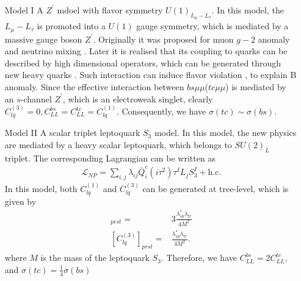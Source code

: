 \documentclass[a4paper,11pt]{article}
\begin{document}
\begin{enumerate}
    \item[Model I]   A $Z^{\prime}$ mdoel with flavor symmetry $U(1)_{L_{\mu}-L_{\tau}}$.
        In this model, the $L_{\mu}-L_{\tau}$ is promoted into a $U(1)$ gauge symmetry,
        which is mediated by a massive gauge boson $Z^{\prime}$.
    Originally it was proposed for muon $g-2$ anomaly \cite{Baek:2001kca} and neutrino mixing \cite{Ma:2001md}.
    Later it is realised that its coupling to quarks can be described by high dimensional operators, which can be generated through new heavy quarks \cite{Fox:2011qd}.
    Such interaction can induce flavor violation \cite{Altmannshofer:2014cfa}, to explain B anomaly.
    Since the effective interaction between $bs\mu\mu$($tc\mu\mu$) is mediated by an $s$-channel $Z^{\prime}$, which is an electroweak singlet,
    clearly $C_{lq}^{(3)}=0,C_{LL}^{bs}=C_{LL}^{tc}=C_{lq}^{(1)}$.
    Consequently, we have $\sigma(tc)\sim\sigma(bs)$.

    \item[Model II] A scalar triplet leptoquark $S_3$ model.
        In this model, the new physics are mediated by a heavy scalar leptoquark, which belongs to $SU(2)_L$ triplet.
        The corresponding Lagrangian can be written as \cite{Dorsner:2016wpm}
        \begin{align}
            \mathcal{L}_{NP}=\sum_{i,j}\lambda_{ij}\bar{Q}_i^c(i\tau^2)\tau^{I}L_jS_3^{I}+\textrm{h.c.}
        \end{align}
        In this model, both $C_{lq}^{(1)}$ and $C_{lq}^{(3)}$ can be generated at tree-level, which is given by \cite{Gherardi:2020det}
        \begin{align}
            [C_{lq}^{(1)}]_{prst}=&3\frac{\lambda_{sp}^{*}\lambda_{tr}}{4M^2}\\
            [C_{lq}^{(3)}]_{prst}=&\frac{\lambda_{sp}^{*}\lambda_{tr}}{4M^2}.
        \end{align}
        where $M$ is the mass of the leptoquark $S_3$.
        Therefore, we have $C_{LL}^{bs}=2C_{LL}^{tc}$,
        and $\sigma(tc)=\frac{1}{4}\sigma(bs)$


\end{enumerate}
\end{document}
